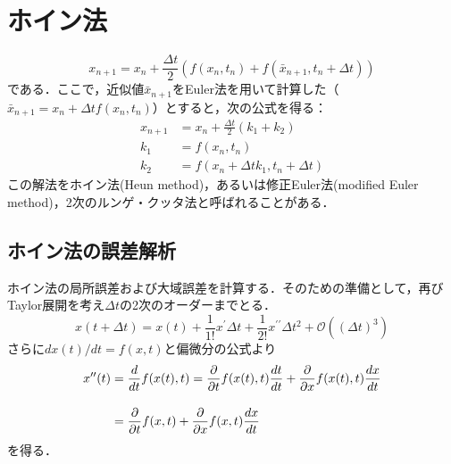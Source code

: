 \section{ホイン法}
\begin{equation}
	x_{n+1}=x_n+\frac{\Delta t}{2}\left(
	f(x_n,t_n)
	+f(\bar{x}_{n+1},t_{n}+\Delta t)
	\right)
\end{equation}
である．ここで，近似値$\bar{x}_{n+1}$をEuler法を用いて計算した（$\bar{x}_{n+1}=x_n+\Delta t f(x_n,t_n)$）とすると，次の公式を得る：
\begin{align}\label{Heun}
	x_{n+1}&=x_n+\frac{\Delta t}{2}(k_1+k_2)\\[10pt]
	k_1&=f(x_n,t_n)\\[10pt]
	k_2&=f(x_n+\Delta t k_1, t_n + \Delta t)
\end{align}
この解法をホイン法(Heun method)，あるいは修正Euler法(modified Euler method)，2次のルンゲ・クッタ法と呼ばれることがある．

\subsection{ホイン法の誤差解析}
ホイン法の局所誤差および大域誤差を計算する．そのための準備として，再びTaylor展開を考え$\Delta t$の2次のオーダーまでとる．
\begin{equation}
	x(t+\Delta t)=x(t) +\frac{1}{1!}x^{\prime}\Delta t +\frac{1}{2!}x^{\prime\prime}\Delta t^2+\mathcal{O}((\Delta t)^3)
\end{equation}
さらに$dx(t)/dt=f(x,t)$と偏微分の公式より
\begin{align}\label{P}
	x^{\prime\prime}(t)&=\frac{d}{dt}f(x(t),t)
	=\frac{\partial }{\partial t}f(x(t),t)\frac{dt}{dt}+\frac{\partial }{\partial x}f(x(t),t)\frac{dx}{dt}\nn[10pt]
	&=\frac{\partial }{\partial t}f(x,t)+\frac{\partial }{\partial x}f(x,t)\frac{dx}{dt}
\end{align}
を得る．

